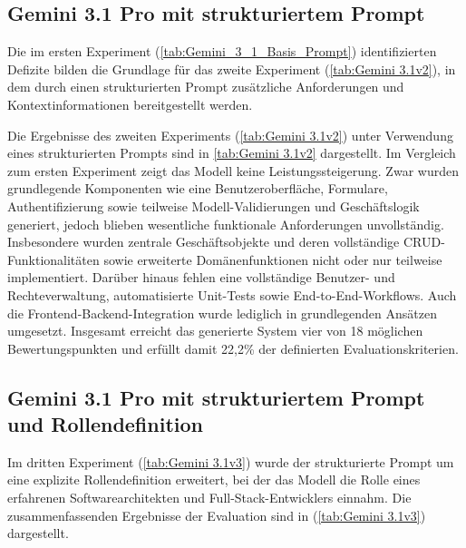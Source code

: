 \subsection{Gemini 3.1 Pro mit strukturiertem Prompt}
Die im ersten Experiment (\ref{tab:Gemini_3_1_Basis_Prompt}) identifizierten Defizite bilden die Grundlage für das zweite Experiment (\ref{tab:Gemini 3.1v2}), in dem durch einen strukturierten Prompt zusätzliche Anforderungen und Kontextinformationen bereitgestellt werden.

Die Ergebnisse des zweiten Experiments (\ref{tab:Gemini 3.1v2}) unter Verwendung eines strukturierten Prompts sind in \vref{tab:Gemini 3.1v2} dargestellt. Im Vergleich zum ersten Experiment zeigt das Modell keine Leistungssteigerung. Zwar wurden grundlegende Komponenten wie eine Benutzeroberfläche, Formulare, Authentifizierung sowie teilweise Modell-Validierungen und Geschäftslogik generiert, jedoch blieben wesentliche funktionale Anforderungen unvollständig. Insbesondere wurden zentrale Geschäftsobjekte und deren vollständige CRUD-Funktionalitäten sowie erweiterte Domänenfunktionen nicht oder nur teilweise implementiert. Darüber hinaus fehlen eine vollständige Benutzer- und Rechteverwaltung, automatisierte Unit-Tests sowie End-to-End-Workflows. Auch die Frontend-Backend-Integration wurde lediglich in grundlegenden Ansätzen umgesetzt. Insgesamt erreicht das generierte System vier von 18 möglichen Bewertungspunkten und erfüllt damit 22,2\% der definierten Evaluationskriterien. 

\subsection{Gemini 3.1 Pro mit strukturiertem Prompt und Rollendefinition}
Im dritten Experiment (\ref{tab:Gemini 3.1v3}) wurde der strukturierte Prompt um eine explizite Rollendefinition erweitert, bei der das Modell die Rolle eines erfahrenen Softwarearchitekten und Full-Stack-Entwicklers einnahm. Die zusammenfassenden Ergebnisse der Evaluation sind in (\ref{tab:Gemini 3.1v3}) dargestellt.

